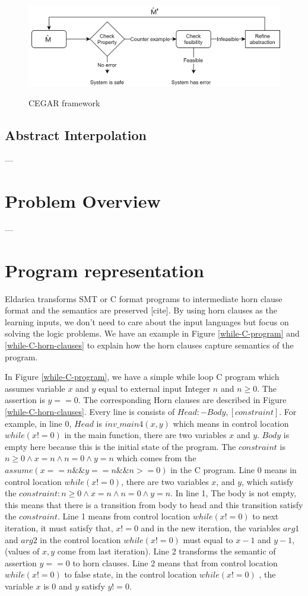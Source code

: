\documentclass{article}
\begin{document}
\begin{figure}[h]
\centering
  \includegraphics[width=12cm]{graph/CEGAR}\\
  \caption{CEGAR framework}\label{CEGAR}
\end{figure}




\subsection{Abstract Interpolation}
---
\section{Problem Overview}
---

\section{Program representation}
Eldarica transforms SMT or C format programs to intermediate horn clause format and the semantics are preserved [cite].  By using horn clauses as the learning inputs, we don't need to care about the input languages but focus on solving the logic problems. We have an example in Figure \ref{while-C-program} and \ref{while-C-horn-clauses} to explain how the horn clauses capture semantics of the program.

In Figure \ref{while-C-program}, we have a simple while loop C program which assumes variable $x$ and $y$ equal to external input Integer $n$ and $n\geq 0$. The assertion is $y==0$. The corresponding Horn clauses are described in  Figure \ref{while-C-horn-clauses}. Every line is consists of $Head:-Body,[constraint]$. For example, in line 0, $Head$ is $inv\_main4(x, y)$ which means in control location $while(x!=0)$ in the main function, there are two variables $x$ and $y$. $Body$ is empty here because this is the initial state of the program. The $constraint$ is $n \geq 0 \wedge x = n \wedge n = 0 \wedge y = n$ which comes from the $assume(x==n\&\&y==n\&\&n>=0)$ in the C program. Line 0 means in control location $while(x!=0)$, there are two variables $x$, and $y$, which satisfy the $constraint: n \geq 0 \wedge x = n \wedge n = 0 \wedge y = n$. In line 1, The body is not empty, this means that there is a transition from body to head and this transition satisfy the $constraint$. Line 1 means from control location $while(x!=0)$ to next iteration, it must satisfy that, $x!=0$ and in the new iteration, the variables $arg1$ and $arg2$ in the control location $while(x!=0)$ must equal to $x-1$ and $y-1$, (values of $x,y$ come from last iteration). Line 2 transforms the semantic of assertion $y==0$ to horn clauses. Line 2 means that from control  location $while(x!=0)$ to false state, in the control location $while(x!=0)$ , the variable $x$ is 0 and $y$ satisfy $y!=0$.
\end{document}
